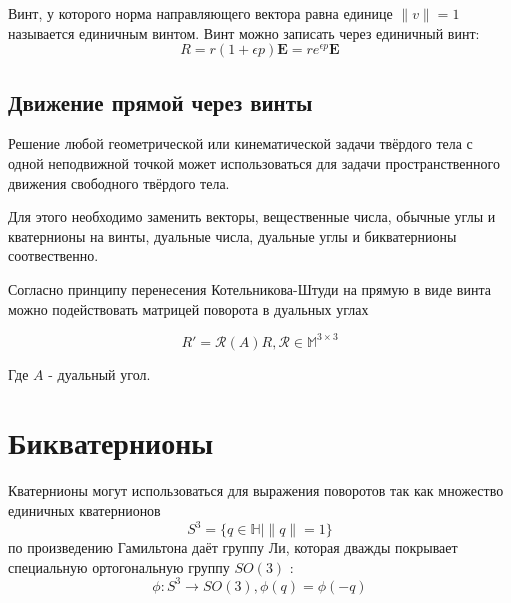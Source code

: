   Винт, у которого норма направляющего вектора равна единице $\| v \| = 1$ называется единичным винтом. Винт можно записать через единичный винт:
  \begin{equation*}
    R = r(1+\epsilon p)\mathbf{E} = r e^{\epsilon p}\mathbf{E}
  \end{equation*}

  \subsection{Движение прямой через винты}
  
  \begin{theo}%
  \label{theo:one}  

    Решение любой геометрической или кинематической задачи твёрдого тела с одной неподвижной точкой может использоваться для задачи пространственного движения 
    свободного твёрдого тела.

    Для этого необходимо заменить векторы, вещественные числа, обычные углы и кватернионы на винты, дуальные числа, дуальные углы и бикватернионы соотвественно. 
  \end{theo}

  Согласно принципу перенесения Котельникова-Штуди на прямую в виде винта можно подействовать матрицей поворота в дуальных углах
  
  \begin{equation*}
    R' = \mathcal{R}(A) R, \mathcal{R} \in \mathbb{M}^{3 \times 3}
  \end{equation*}

  Где $A$ - дуальный угол. 

  \section{Бикватернионы}

  Кватернионы могут использоваться для выражения поворотов \autocite[Гл. N]{chelnokov2006кватернионные} так как множество единичных кватернионов 
  \begin{equation*}
    S^3 = \{q \in \mathbb{H} \mid \|q\| =1\}
  \end{equation*}
  по произведению Гамильтона даёт группу Ли, которая дважды покрывает специальную ортогональную группу $SO(3)$ \autocite[Гл. 12]{altmann1986rotations}:
  \begin{equation*}
    \phi : S^3 \rightarrow SO(3), \phi(q) = \phi(-q)
  \end{equation*}

